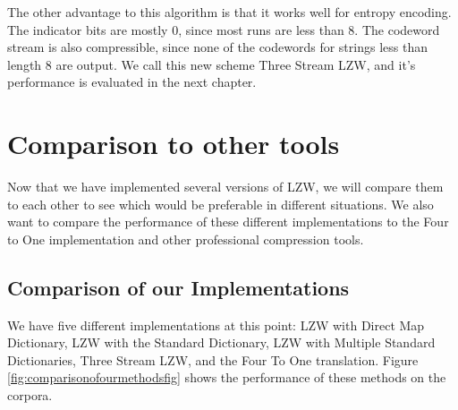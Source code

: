 \documentclass[12pt,twoside]{reedthesis}
\begin{document}
The other advantage to this algorithm is that it works well for entropy encoding. The indicator bits are mostly 0, since most runs are less than 8. The codeword stream is also compressible, since none of the codewords for strings less than length 8 are output. We call this new scheme Three Stream LZW, and it's performance is evaluated in the next chapter.

\hypertarget{comparison-to-other-tools}{%
\chapter{Comparison to other tools}\label{comparison-to-other-tools}}

Now that we have implemented several versions of LZW, we will compare them to each other to see which would be preferable in different situations. We also want to compare the performance of these different implementations to the Four to One implementation and other professional compression tools.

\hypertarget{comparison-of-our-implementations}{%
\section{Comparison of our Implementations}\label{comparison-of-our-implementations}}

We have five different implementations at this point: LZW with Direct Map Dictionary, LZW with the Standard Dictionary, LZW with Multiple Standard Dictionaries, Three Stream LZW, and the Four To One translation. Figure \ref{fig:comparisonofourmethodsfig} shows the performance of these methods on the corpora.
\end{document}
